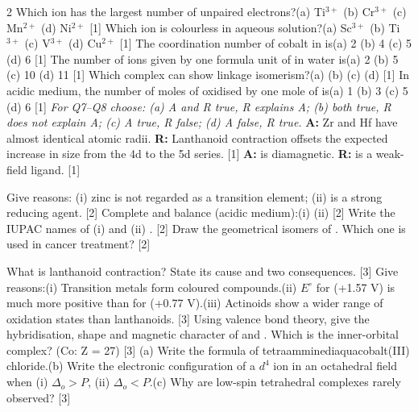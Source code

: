 \documentclass[10pt,a4paper]{extarticle}
\newcommand{\mk}[1]{{\scriptsize\color{black!55}[#1]}}
\begin{document}
\begin{multicols}{2}\raggedcolumns
{}
\Q Which ion has the largest number of unpaired electrons?\nl (a) Ti$^{3+}$ \quad (b) Cr$^{3+}$ \quad (c) Mn$^{2+}$ \quad (d) Ni$^{2+}$ \mk{1}
\Q Which ion is colourless in aqueous solution?\nl (a) Sc$^{3+}$ \quad (b) Ti$^{3+}$ \quad (c) V$^{3+}$ \quad (d) Cu$^{2+}$ \mk{1}
\Q The coordination number of cobalt in \ce{[CoCl2(en)2]+} is\nl (a) 2 \quad (b) 4 \quad (c) 5 \quad (d) 6 \mk{1}
\Q The number of ions given by one formula unit of  in water is\nl (a) 2 \quad (b) 5 \quad (c) 10 \quad (d) 11 \mk{1}
\Q Which complex can show linkage isomerism?\nl (a)  \quad (b) \nl (c)  \quad (d)  \mk{1}
\Q In acidic medium, the number of moles of  oxidised by one mole of  is\nl (a) 1 \quad (b) 3 \quad (c) 5 \quad (d) 6 \mk{1}
\nl\textit{For Q7--Q8 choose: (a) A and R true, R explains A; (b) both true, R does not explain A; (c) A true, R false; (d) A false, R true.}
\Q \textbf{A:} Zr and Hf have almost identical atomic radii. \textbf{R:} Lanthanoid contraction offsets the expected increase in size from the 4d to the 5d series. \mk{1}
\Q \textbf{A:}  is diamagnetic. \textbf{R:}  is a weak-field ligand. \mk{1}

\Q Give reasons: (i) zinc is not regarded as a transition element; (ii)  is a strong reducing agent. \mk{2}
\Q Complete and balance (acidic medium):\nl (i)  \quad (ii)  \mk{2}
\Q Write the IUPAC names of (i)  and (ii) . \mk{2}
\Q Draw the geometrical isomers of \ce{[Pt(NH3)2Cl2]}. Which one is used in cancer treatment? \mk{2}

\Q What is lanthanoid contraction? State its cause and two consequences. \mk{3}
\Q Give reasons:\nl (i) Transition metals form coloured compounds.\nl (ii) $E^\circ$ for  (+1.57 V) is much more positive than for  (+0.77 V).\nl (iii) Actinoids show a wider range of oxidation states than lanthanoids. \mk{3}
\Q Using valence bond theory, give the hybridisation, shape and magnetic character of  and . Which is the inner-orbital complex? (Co: Z = 27) \mk{3}
\Q (a) Write the formula of tetraamminediaquacobalt(III) chloride.\nl (b) Write the electronic configuration of a $d^4$ ion in an octahedral field when (i) $\Delta_o>P$, (ii) $\Delta_o<P$.\nl (c) Why are low-spin tetrahedral complexes rarely observed? \mk{3}


\end{multicols}
\end{document}

